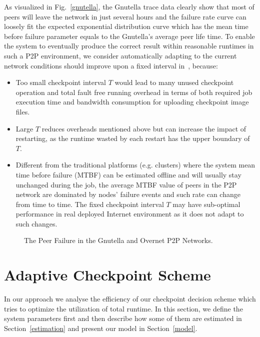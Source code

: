 \documentclass[times, 12pt, onecolumn]{article}
\newcommand{\refsec}[1]{Section~\ref{#1}}
\newcommand{\reffig}[1]{Fig.~\ref{#1}}
\begin{document}
As visualized in \reffig{gnutella}, the Gnutella trace data clearly show that most of peers 
will leave the network in just several hours and the failure rate curve can loosely fit the 
expected exponential distribution curve which has the mean time before failure parameter 
equals to the Gnutella's average peer life time. 
To enable the system to eventually produce the correct result within reasonable runtimes in such a
P2P environment, we consider automatically adapting to the current network conditions should improve upon
a fixed interval in~\cite{dvm}, because:
\begin{itemize}
\item Too small checkpoint interval $T$ would lead to many unused checkpoint operation and total 
fault free running overhead in terms of both required job execution time and bandwidth consumption for
uploading checkpoint image files. 
\item Large $T$ reduces overheads mentioned above but can increase the impact of restarting, as the
runtime wasted by each restart has the upper boundary of $T$.
\item Different from the traditional platforms (e.g. clusters) where the system mean time before failure 
(MTBF) can be estimated offline and will usually stay unchanged during the job, the average MTBF value of 
peers in the P2P network are dominated by nodes' failure events and such rate can change from time to time. 
The fixed checkpoint interval $T$ may have sub-optimal performance in real deployed Internet environment as it 
does not adapt to such changes. 
\end{itemize}

\begin{figure*}
\centering
{}
\caption{The Peer Failure in the Gnutella and Overnet P2P Networks.}
\label{failurerate}
\end{figure*}


\section{Adaptive Checkpoint Scheme}
\label{scheme}
In our approach we analyse the efficiency of our checkpoint decision scheme which tries to optimize the 
utilization of total runtime. In this section, we define the system parameters first and then describe 
how some of them are estimated in \refsec{estimation} and present our model in \refsec{model}.
\end{document}
